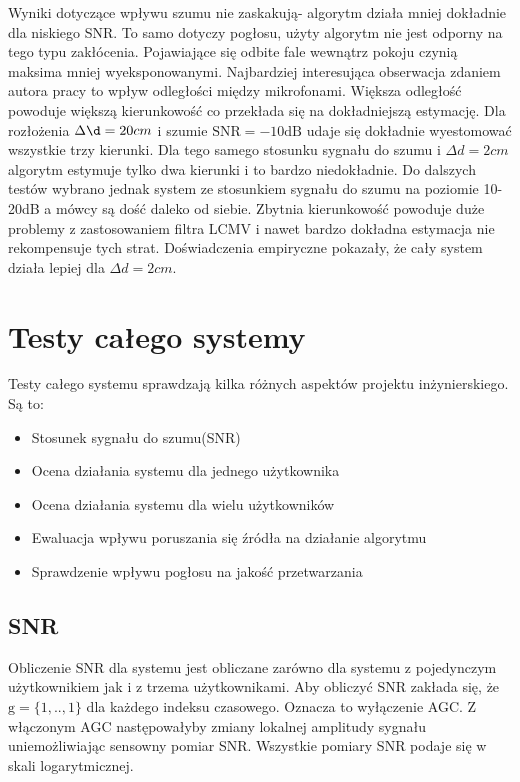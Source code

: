 \noindent Wyniki dotyczące wpływu szumu nie zaskakują- algorytm działa mniej dokładnie dla niskiego SNR. To samo dotyczy pogłosu, użyty algorytm nie jest odporny na tego typu zakłócenia. Pojawiające się odbite fale wewnątrz pokoju czynią maksima mniej wyeksponowanymi. Najbardziej interesująca obserwacja zdaniem autora pracy to wpływ odległości między mikrofonami. Większa odległość powoduje większą kierunkowość co przekłada się na dokładniejszą estymację. Dla rozłożenia $\Delta \d = 20cm$ i szumie $\mathrm{SNR}=-10\mathrm{dB}$ udaje się dokładnie wyestomować wszystkie trzy kierunki. Dla tego samego stosunku sygnału do szumu i $\Delta d = 2cm$ algorytm estymuje tylko dwa kierunki i to bardzo niedokładnie. Do dalszych testów wybrano jednak system ze stosunkiem sygnału do szumu na poziomie 10-20dB a mówcy są dość daleko od siebie. Zbytnia kierunkowość powoduje duże problemy z zastosowaniem filtra LCMV i nawet bardzo dokładna estymacja nie rekompensuje tych strat. Doświadczenia empiryczne pokazały, że cały system działa lepiej dla $\Delta d = 2cm$.

\newpage

\section{Testy całego systemy}

Testy całego systemu sprawdzają kilka różnych aspektów projektu inżynierskiego. Są to:

\begin{itemize}
    \item Stosunek sygnału do szumu(SNR)
    \item Ocena działania systemu dla jednego użytkownika
    \item Ocena działania systemu dla wielu użytkowników
    \item Ewaluacja wpływu poruszania się źródła na działanie algorytmu
    \item Sprawdzenie wpływu pogłosu na jakość przetwarzania
    
\end{itemize}
\subsection{SNR}

Obliczenie SNR dla systemu jest obliczane zarówno dla systemu z pojedynczym użytkownikiem jak i z trzema użytkownikami. Aby obliczyć SNR zakłada się, że $\bm{\mathrm{g}} = \{1,..,1\}$ dla każdego indeksu czasowego. Oznacza to wyłączenie AGC. Z włączonym AGC następowałyby zmiany lokalnej amplitudy sygnału uniemożliwiając sensowny pomiar SNR. Wszystkie pomiary SNR podaje się w skali logarytmicznej.

